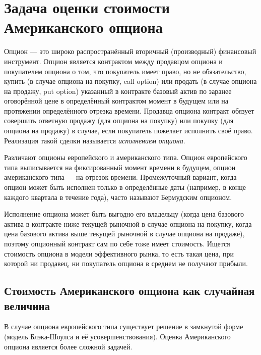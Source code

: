 \documentclass[specialist,
               substylefile = ../spbu.rtx,
               subf,href,colorlinks=true, 12pt]{disser}
\begin{document}
\chapter{Задача оценки стоимости Американского опциона} %
\label{cha:option_price_estimation_problem}

Опцион --- это широко распространённый вторичный (производный) финансовый инструмент. Опцион является контрактом между продавцом опциона и покупателем опциона о том, что покупатель имеет право, но не обязательство, купить (в случае опциона на покупку, call option) или продать (в случае опциона на продажу, put option) указанный в контракте базовый актив по заранее оговорённой цене в определённый контрактом момент в будущем или на протяжении определённого отрезка времени. Продавца опциона контракт обязует совершить ответную продажу (для опциона на покупку) или покупку (для опциона на продажу) в случае, если покупатель пожелает исполнить своё право. Реализация такой сделки называется \emph{исполнением опциона}.

Различают опционы европейского и американского типа. Опцион европейского типа выписывается на фиксированный момент времени в будущем, опцион американского типа --- на отрезок времени. Промежуточный вариант, когда опцион может быть исполнен только в определённые даты (например, в конце каждого квартала в течение года), часто называют Бермудским опционом.

Исполнение опциона может быть выгодно его владельцу (когда цена базового актива в контракте ниже текущей рыночной в случае опциона на покупку, когда цена базового актива выше текущей рыночной в случае опциона на продаже), поэтому опционный контракт сам по себе тоже имеет стоимость. Ищется стоимость опциона в модели эффективного рынка, то есть такая цена, при которой ни продавец, ни покупатель опциона в среднем не получают прибыли.

\section{Стоимость Американского опциона как случайная величина} %
\label{sec:option_price}

В случае опциона европейского типа существует решение в замкнутой форме (модель Блэка-Шоулса \cite{Black1973} и её усовершенствования). Оценка Американского опциона является более сложной задачей.
\end{document}
